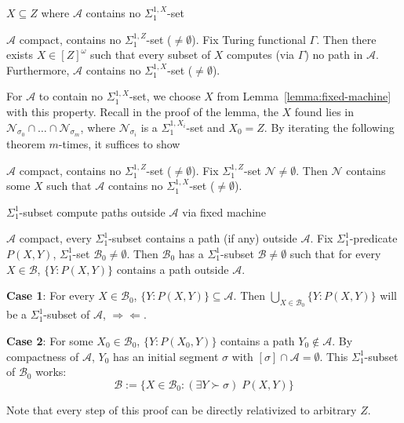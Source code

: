 \begin{frame}{$X\subseteq Z$ where $\mathcal{A}$ contains no
$\Sigma_1^{1,X}$-set}
  \begin{lemma-strengthened1*}
    $\mathcal{A}$ compact, contains no $\Sigma_1^{1,Z}$-set
    ($\neq\emptyset$). Fix Turing functional $\Gamma$. Then
    there exists $X\in[Z]^\omega$ such that every subset of $X$ computes
    (via $\Gamma$) no path in $\mathcal{A}$. Furthermore, $\mathcal{A}$
    contains no $\Sigma_1^{1,X}$-set ($\neq\emptyset$).
  \end{lemma-strengthened1*}

  \vspace{0.5em}
  For $\mathcal{A}$ to contain no $\Sigma_1^{1,X}$-set, we choose $X$ from
  Lemma~\ref{lemma:fixed-machine} with this property. Recall
  in the proof of the lemma, the $X$ found lies in
  $\mathcal{N}_{\sigma_0}\cap \ldots\cap\mathcal{N}_{\sigma_m}$,
  where $\mathcal{N}_{\sigma_i}$ is a $\Sigma_1^{1,X_i}$-set and $X_0=Z$.
  By iterating the following theorem $m$-times, it suffices to show

  \vspace{0.5em}
  \begin{thm}
    $\mathcal{A}$ compact, contains no $\Sigma_1^{1,Z}$-set
    ($\neq\emptyset$). Fix $\Sigma_1^{1,Z}$-set
    $\mathcal{N}\neq\emptyset$. Then $\mathcal{N}$ contains some $X$ such
    that $\mathcal{A}$ contains no $\Sigma_1^{1,X}$-set ($\neq\emptyset$).
  \end{thm}
\end{frame}

\begin{frame}{$\Sigma_1^1$-subset compute paths outside
$\mathcal{A}$ via fixed machine}
  \begin{claim}
    $\mathcal{A}$ compact, every $\Sigma_1^{1}$-subset contains a path (if
    any) outside $\mathcal{A}$. Fix $\Sigma_1^{1}$-predicate $P(X,Y)$,
    $\Sigma_1^{1}$-set $\mathcal{B}_0\neq\emptyset$. Then $\mathcal{B}_0$
    has a $\Sigma_1^{1}$-subset $\mathcal{B}\neq\emptyset$ such that for
    every $X\in\mathcal{B}$, $\{Y:P(X,Y)\}$ contains a path outside
    $\mathcal{A}$.
  \end{claim}

  \textbf{Case 1}: For every $X\in\mathcal{B}_0$,
  $\{Y:P(X,Y)\}\subseteq\mathcal{A}$. Then $\bigcup_{X\in\mathcal{B}_0}
  \{Y:P(X,Y)\}$ will be a $\Sigma_1^1$-subset of $\mathcal{A}$,
  $\Rightarrow\Leftarrow$.

  \vspace{0.5em}
  \textbf{Case 2}: For some $X_0\in\mathcal{B}_0$, $\{Y:P(X_0,Y)\}$
  contains a path $Y_0\not\in\mathcal{A}$. By compactness of $\mathcal{A}$,
  $Y_0$ has an initial segment $\sigma$ with $[\sigma]\cap\mathcal{A}
  =\emptyset$. This $\Sigma_1^1$-subset of $\mathcal{B}_0$ works:
  \[\mathcal{B}:= \{X\in\mathcal{B}_0: (\exists Y\succ\sigma)\; P(X,Y)\}\]

  Note that every step of this proof can be directly relativized to
  arbitrary $Z$.
\end{frame}

